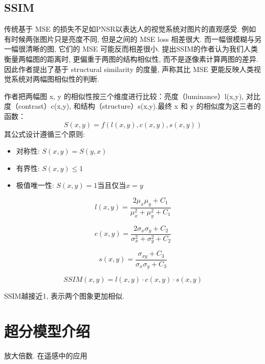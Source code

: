 \subsection{SSIM}
传统基于 MSE 的损失不足如PNSR以表达人的视觉系统对图片的直观感受. 例如有时候两张图片只是亮度不同, 但是之间的 MSE loss 相差很大. 而一幅很模糊与另一幅很清晰的图, 它们的 MSE 可能反而相差很小. 提出SSIM的作者认为我们人类衡量两幅图的距离时, 更偏重于两图的结构相似性, 而不是逐像素计算两图的差异. 因此作者提出了基于 structural similarity 的度量, 声称其比 MSE 更能反映人类视觉系统对两幅图相似性的判断.

作者把两幅图 x, y 的相似性按三个维度进行比较：亮度（luminance）l(x,y), 对比度（contrast）c(x,y), 和结构（structure）s(x,y).最终 x 和 y 的相似度为这三者的函数：
\begin{equation}
    S(x,y)=f(l(x,y), c(x,y), s(x,y))
\end{equation}
其公式设计遵循三个原则:
\begin{itemize}
    \item 对称性: $S(x,y)=S(y,x)$
    \item 有界性: $S(x,y)\leq 1$
    \item 极值唯一性: $S(x,y)=1$当且仅当$x=y$
\end{itemize}

\begin{equation}
    l(x,y)=\frac{2\mu_{x}\mu_{y}+C_{1}}{\mu_{x}^{2}+\mu_{y}^{2}+C_{1}}
\end{equation}

\begin{equation}
    c(x,y)=\frac{2\sigma_{x}\sigma_{y}+C_{2}}{\sigma_{x}^{2}+\sigma_{y}^{2}+C_{2}}
\end{equation}

\begin{equation}
    s(x,y)=\frac{\sigma_{xy}+C_{3}}{\sigma_{x}\sigma_{y}+C_{3}}
\end{equation}

\begin{equation}
    SSIM(x,y)=l(x,y)\cdot c(x,y)\cdot s(x,y)
\end{equation}

SSIM越接近1, 表示两个图象更加相似.

\section{超分模型介绍}
放大倍数. 在遥感中的应用


